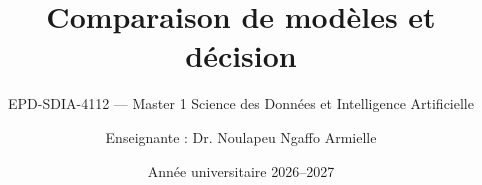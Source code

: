 
\title[Chapitre 4 --- Comparaison de modèles et décision]{Comparaison de modèles et décision}
\subtitle{EPD-SDIA-4112 --- Master 1 Science des Données et Intelligence Artificielle}
\author{Enseignante : Dr. Noulapeu Ngaffo Armielle}
\date{Année universitaire 2026--2027}





